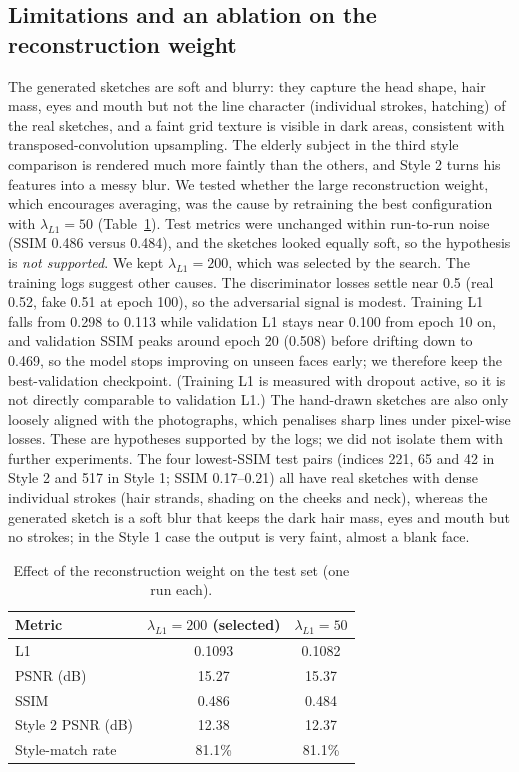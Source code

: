 \documentclass[conference]{IEEEtran}
\begin{document}
\subsection{Limitations and an ablation on the reconstruction weight}
The generated sketches are soft and blurry: they capture the head shape, hair mass, eyes and mouth but not the line character (individual strokes, hatching) of the real sketches, and a faint grid texture is visible in dark areas, consistent with transposed-convolution upsampling. The elderly subject in the third style comparison is rendered much more faintly than the others, and Style 2 turns his features into a messy blur. We tested whether the large reconstruction weight, which encourages averaging, was the cause by retraining the best configuration with $\lambda_{L1}=50$ (Table~\ref{tab:t4abl}). Test metrics were unchanged within run-to-run noise (SSIM 0.486 versus 0.484), and the sketches looked equally soft, so the hypothesis is \emph{not supported}. We kept $\lambda_{L1}=200$, which was selected by the search. The training logs suggest other causes. The discriminator losses settle near 0.5 (real 0.52, fake 0.51 at epoch 100), so the adversarial signal is modest. Training L1 falls from 0.298 to 0.113 while validation L1 stays near 0.100 from epoch 10 on, and validation SSIM peaks around epoch 20 (0.508) before drifting down to 0.469, so the model stops improving on unseen faces early; we therefore keep the best-validation checkpoint. (Training L1 is measured with dropout active, so it is not directly comparable to validation L1.) The hand-drawn sketches are also only loosely aligned with the photographs, which penalises sharp lines under pixel-wise losses. These are hypotheses supported by the logs; we did not isolate them with further experiments. The four lowest-SSIM test pairs (indices 221, 65 and 42 in Style 2 and 517 in Style 1; SSIM 0.17--0.21) all have real sketches with dense individual strokes (hair strands, shading on the cheeks and neck), whereas the generated sketch is a soft blur that keeps the dark hair mass, eyes and mouth but no strokes; in the Style 1 case the output is very faint, almost a blank face.

\begin{table}[t]
\centering
\caption{Effect of the reconstruction weight on the test set (one run each).}\label{tab:t4abl}
\footnotesize\setlength{\tabcolsep}{5pt}
\begin{tabular}{@{}lcc@{}}
\toprule
Metric & $\lambda_{L1}=200$ (selected) & $\lambda_{L1}=50$\\
\midrule
L1 & 0.1093 & 0.1082\\
PSNR (dB) & 15.27 & 15.37\\
SSIM & 0.486 & 0.484\\
Style 2 PSNR (dB) & 12.38 & 12.37\\
Style-match rate & 81.1\% & 81.1\%\\
\bottomrule
\end{tabular}
\end{table}
\end{document}
